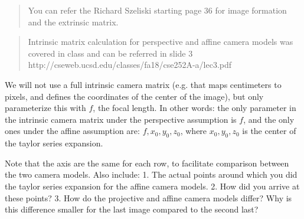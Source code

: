 \documentclass[11pt]{article}
\begin{document}
\begin{quote}
You can refer the Richard Szeliski starting page 36 for image formation
and the extrinsic matrix.
\end{quote}

\begin{quote}
Intrinsic matrix calculation for perspective and affine camera models
was covered in class and can be referred in slide 3
http://cseweb.ucsd.edu/classes/fa18/cse252A-a/lec3.pdf
\end{quote}

We will not use a full intrinsic camera matrix (e.g. that maps
centimeters to pixels, and defines the coordinates of the center of the
image), but only parameterize this with \(f\), the focal length. In
other words: the only parameter in the intrinsic camera matrix under the
perspective assumption is \(f\), and the only ones under the affine
assumption are: \(f,x_0,y_0,z_0\), where \(x_0,y_0,z_0\) is the center
of the taylor series expansion.

Note that the axis are the same for each row, to facilitate comparison
between the two camera models. Also include: 1. The actual points around
which you did the taylor series expansion for the affine camera models.
2. How did you arrive at these points? 3. How do the projective and
affine camera models differ? Why is this difference smaller for the last
image compared to the second last?
\end{document}
